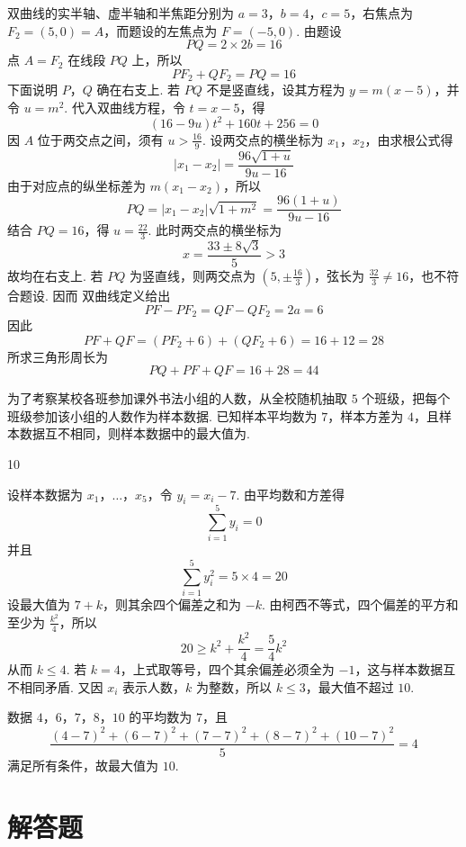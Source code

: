 \begin{solution}
双曲线的实半轴、虚半轴和半焦距分别为 \(a=3\)，\(b=4\)，\(c=5\)，右焦点为
\(F_2=(5,0)=A\)，而题设的左焦点为 \(F=(-5,0)\). 由题设
\[
PQ=2\times 2b=16
\]
点 \(A=F_2\) 在线段 \(PQ\) 上，所以
\[
PF_2+QF_2=PQ=16
\]
下面说明 \(P\)，\(Q\) 确在右支上. 若 \(PQ\) 不是竖直线，设其方程为
\(y=m(x-5)\)，并令 \(u=m^2\). 代入双曲线方程，令 \(t=x-5\)，得
\[
(16-9u)t^2+160t+256=0
\]
因 \(A\) 位于两交点之间，须有 \(u>\frac{16}{9}\). 设两交点的横坐标为
\(x_1\)，\(x_2\)，由求根公式得
\[
|x_1-x_2|=\frac{96\sqrt{1+u}}{9u-16}
\]
由于对应点的纵坐标差为 \(m(x_1-x_2)\)，所以
\[
PQ=|x_1-x_2|\sqrt{1+m^2}
=\frac{96(1+u)}{9u-16}
\]
结合 \(PQ=16\)，得 \(u=\frac{22}{3}\). 此时两交点的横坐标为
\[
x=\frac{33\pm8\sqrt3}{5}>3
\]
故均在右支上. 若 \(PQ\) 为竖直线，则两交点为
\((5,\pm\frac{16}{3})\)，弦长为 \(\frac{32}{3}\ne16\)，也不符合题设. 因而
双曲线定义给出
\[
PF-PF_2=QF-QF_2=2a=6
\]
因此
\[
PF+QF=(PF_2+6)+(QF_2+6)=16+12=28
\]
所求三角形周长为
\[
PQ+PF+QF=16+28=44
\]
\end{solution}

\begin{problem}
为了考察某校各班参加课外书法小组的人数，从全校随机抽取 \(5\) 个班级，把每个班级参加该小组的人数作为样本数据. 已知样本平均数为 \(7\)，样本方差为 \(4\)，且样本数据互不相同，则样本数据中的最大值为\fillinblank{}.
\end{problem}

\begin{answer}
10
\end{answer}

\begin{solution}
设样本数据为 \(x_1\)，\(\ldots\)，\(x_5\)，令 \(y_i=x_i-7\). 由平均数和方差得
\[
\sum_{i=1}^5y_i=0
\]
并且
\[
\sum_{i=1}^5y_i^2=5\times4=20
\]
设最大值为 \(7+k\)，则其余四个偏差之和为 \(-k\). 由柯西不等式，四个偏差的平方和至少为
\(\frac{k^2}{4}\)，所以
\[
20\geqslant k^2+\frac{k^2}{4}=\frac54k^2
\]
从而 \(k\leqslant4\). 若 \(k=4\)，上式取等号，四个其余偏差必须全为 \(-1\)，这与样本数据互不相同矛盾. 又因 \(x_i\) 表示人数，\(k\) 为整数，所以 \(k\leqslant3\)，最大值不超过 \(10\).

数据 \(4\)，\(6\)，\(7\)，\(8\)，\(10\) 的平均数为 \(7\)，且
\[
\frac{(4-7)^2+(6-7)^2+(7-7)^2+(8-7)^2+(10-7)^2}{5}=4
\]
满足所有条件，故最大值为 \(10\).
\end{solution}

\section{解答题}

